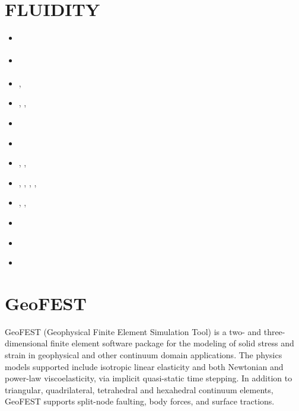 \section{FLUIDITY}

\begin{small}
\begin{itemize}
\item[\twothousandeleven]      \textcite{dawk11}
\item[\twothousandtwelve]      \textcite{krwd12}
\item[\twothousandfourteen]    \textcite{gagd14},  \textcite{ledg14}
\item[\twothousandsixteen]     \textcite{dalg16},  \textcite{jodc16}, \textcite{pegp16} 
\item[\twothousandseventeen]   \textcite{hegd17}
\item[\twothousandeighteen]    \textcite{pegp18}
\item[\twothousandtwenty]      \textcite{algg20},  \textcite{mapg20}, 
                               \textcite{gatt20}
\item[\twothousandtwentyone]   \textcite{sugm21},  \textcite{kndc21},
                               \textcite{befd21},  \textcite{dudm21},
                               \textcite{gath21} 
\item[\twothousandtwentytwo]   \textcite{cesg22},  \textcite{chdg22a}, \textcite{chdg22b}
\item[\twothousandtwentythree] \textcite{pidh23} 
\item[\twothousandtwentyfour]  \textcite{chdg24} 
\item[\twothousandtwentyfive]  \textcite{jidh25} 

\end{itemize}
\end{small}



\section{GeoFEST} 
GeoFEST (Geophysical Finite Element Simulation Tool) is a two- and three-dimensional finite
element software package for the modeling of solid stress and strain in geophysical and 
other continuum domain applications.
The physics models supported include isotropic linear elasticity and both Newtonian and power-law
viscoelasticity, via implicit quasi-static time stepping. In addition to triangular, 
quadrilateral, tetrahedral and hexahedral continuum elements, GeoFEST supports split-node 
faulting, body forces, and surface tractions.


